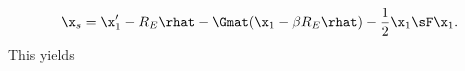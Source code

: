 \begin{equation}
\x_s = \x'_1 - R_E \rhat - \Gmat(\x_1 - \beta R_E \rhat) - \frac{1}{2} \x_1 \sF \x_1.
\end{equation}
This yields
  
  